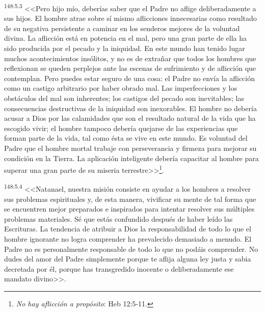 \par 
\textsuperscript{148:5.3} <<Pero hijo mío, deberías saber que el Padre no aflige deliberadamente a sus hijos. El hombre atrae sobre sí mismo aflicciones innecesarias como resultado de su negativa persistente a caminar en los senderos mejores de la voluntad divina. La aflicción está en potencia en el mal, pero una gran parte de ella ha sido producida por el pecado y la iniquidad. En este mundo han tenido lugar muchos acontecimientos insólitos, y no es de extrañar que todos los hombres que reflexionan se queden perplejos ante las escenas de sufrimiento y de aflicción que contemplan. Pero puedes estar seguro de una cosa: el Padre no envía la aflicción como un castigo arbitrario por haber obrado mal. Las imperfecciones y los obstáculos del mal son inherentes; los castigos del pecado son inevitables; las consecuencias destructivas de la iniquidad son inexorables. El hombre no debería acusar a Dios por las calamidades que son el resultado natural de la vida que ha escogido vivir; el hombre tampoco debería quejarse de las experiencias que forman parte de la vida, tal como ésta se vive en este mundo. Es voluntad del Padre que el hombre mortal trabaje con perseverancia y firmeza para mejorar su condición en la Tierra. La aplicación inteligente debería capacitar al hombre para superar una gran parte de su miseria terrestre>>\footnote{\textit{No hay aflicción a propósito}: Heb 12:5-11.}.

\par 
\textsuperscript{148:5.4} <<Natanael, nuestra misión consiste en ayudar a los hombres a resolver sus problemas espirituales y, de esta manera, vivificar su mente de tal forma que se encuentren mejor preparados e inspirados para intentar resolver sus múltiples problemas materiales. Sé que estás confundido después de haber leído las Escrituras. La tendencia de atribuir a Dios la responsabilidad de todo lo que el hombre ignorante no logra comprender ha prevalecido demasiado a menudo. El Padre no es personalmente responsable de todo lo que no podáis comprender. No dudes del amor del Padre simplemente porque te aflija alguna ley justa y sabia decretada por él, porque has transgredido inocente o deliberadamente ese mandato divino>>.

